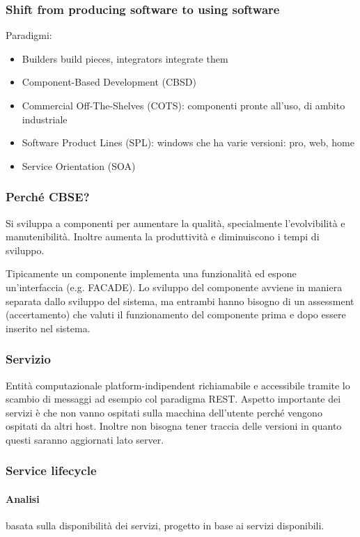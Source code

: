 \documentclass[10pt,a4paper]{book}
\begin{document}
\subsubsection{Shift from producing software to using software}
Paradigmi:
\begin{itemize}
\item Builders build pieces, integrators integrate them
\item Component-Based Development (CBSD)
\item Commercial Off-The-Shelves (COTS): componenti pronte all'uso, di ambito industriale
\item Software Product Lines (SPL): windows che ha varie versioni: pro, web, home
\item Service Orientation (SOA)
\end{itemize}

\subsubsection{Perché CBSE?}
Si sviluppa a componenti per aumentare la qualità, specialmente l'evolvibilità e manutenibilità. Inoltre aumenta la produttività e diminuiscono i tempi di sviluppo.

Tipicamente un componente implementa una funzionalità ed espone un'interfaccia (e.g. FACADE).
Lo sviluppo del componente avviene in maniera separata dallo sviluppo del sistema, ma entrambi hanno bisogno di un assessment (accertamento) che valuti il funzionamento del componente prima e dopo essere inserito nel sistema.

\subsubsection{Servizio}
Entità computazionale platform-indipendent richiamabile e accessibile tramite lo scambio di messaggi ad esempio col paradigma REST.
Aspetto importante dei servizi è che non vanno ospitati sulla macchina dell'utente perché vengono ospitati da altri host. Inoltre non bisogna tener traccia delle versioni in quanto questi saranno aggiornati lato server.

\subsubsection{Service lifecycle}
\paragraph{Analisi} basata sulla disponibilità dei servizi, progetto in base ai servizi disponibili.
\end{document}
